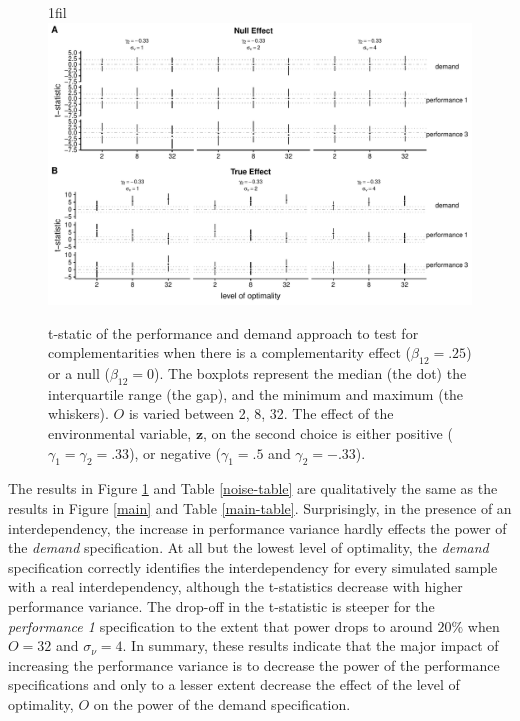 \documentclass[12pt]{article}
\makeatletter
\newcommand*{\centerfloat}{%
  \parindent \z@
  \leftskip \z@ \@plus 1fil \@minus \textwidth
  \rightskip\leftskip
  \parfillskip \z@skip}
\makeatother
\begin{document}
\begin{figure}
\centerfloat
\includegraphics[width=450px]{figure-latex/noise_new_plot.pdf}
\caption[Error Rate and Power with Increasing Levels of Variability in Performance]
{\label{noise} t-static of the performance and demand approach to test
for complementarities when there is a complementarity effect ($\beta_{12} = .25$)
or a null ($\beta_{12} = 0$). The boxplots represent the median (the dot) the
interquartile range (the gap), and the minimum and maximum (the whiskers). $O$
is varied between 2, 8, 32. The effect of the environmental
variable, $\mathbf{z}$, on the second choice is either positive
($\gamma_1 = \gamma_2 = .33$), or negative ($\gamma_1 = .5$ and $\gamma_2 = -.33$).}
\end{figure}



The results in Figure \ref{noise} and Table \ref{noise-table} are qualitatively the same as the results in Figure \ref{main} and Table \ref{main-table}. Surprisingly, in the presence of an interdependency, the increase in performance variance hardly effects the power of the \emph{demand} specification. At all but the lowest level of optimality, the \emph{demand} specification correctly identifies the interdependency for every simulated sample with a real interdependency, although the t-statistics decrease with higher performance variance. The drop-off in the t-statistic is steeper for the \emph{performance 1} specification to the extent that power drops to around \(20\%\) when \(O = 32\) and \(\sigma_{\nu} = 4\). In summary, these results indicate that the major impact of increasing the performance variance is to decrease the power of the performance specifications and only to a lesser extent decrease the effect of the level of optimality, $O$ on the power of the demand specification.
\end{document}
